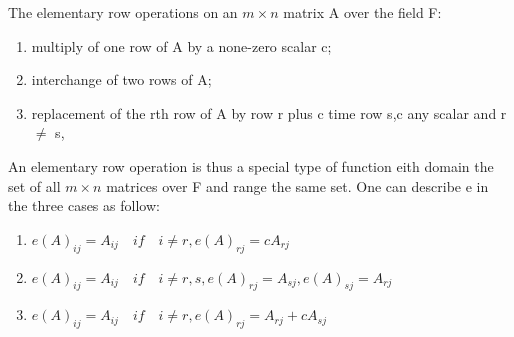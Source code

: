 \documentclass[11pt, a4paper, oneside,UTF8]{ctexbook}
\newtheorem[M]{theorem}{Theorem}[section]
\newtheorem[M]{lemma}[theorem]{Lemma}
\newtheorem[M]{proposition}[theorem]{Proposition}
\newtheorem[M]{corollary}[theorem]{Corollary}
\newtheorem[M]{definition}{Definition}[section]
\begin{document}
The elementary row operations on an $m \times n$ matrix A over the field F:
\begin{enumerate}
	\item multiply of one row of A by a none-zero scalar c;
	\item interchange of two rows of A;
	\item replacement of the rth row of A by row r plus c time row s,c any scalar and r $\neq$ s,
\end{enumerate}

An elementary row operation is thus a special type of function eith domain the set of all $m \times n$ matrices over F and range the same set.
One can describe e in the three cases as follow:
\begin{enumerate}
	\item $e(A)_{ij} = A_{ij} \quad if \quad  i \neq r ,e(A)_{rj} = cA_{rj}$
	\item $e(A)_{ij} = A_{ij} \quad if \quad  i \neq r,s ,e(A)_{rj} = A_{sj},e(A)_{sj} = A_{rj}$
	\item $e(A)_{ij} = A_{ij} \quad if \quad  i \neq r ,e(A)_{rj} = A_{rj}+cA_{sj}$
	      \label{eq:elementary_row_operations describe}
\end{enumerate}
\end{document}
